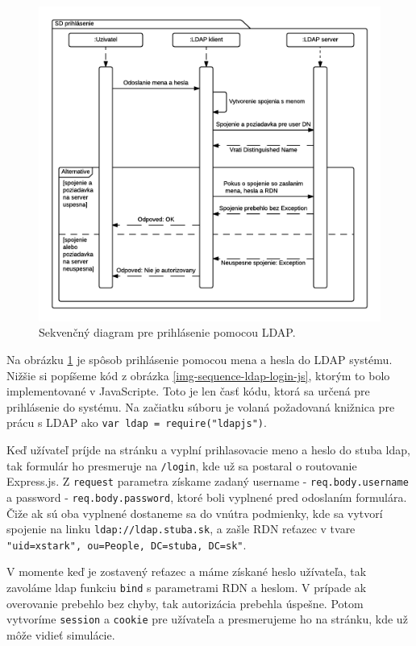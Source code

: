 \begin{figure}[H]
  \centering
  \includegraphics[scale=0.7]{img/diagrams/sequence-ldap.png}
  \caption{Sekvenčný diagram pre prihlásenie pomocou LDAP.}
  \label{img-sequence-ldap-login}
\end{figure}

Na obrázku \ref{img-sequence-ldap-login} je spôsob prihlásenie pomocou mena a hesla do LDAP systému. Nižšie si popíšeme kód z obrázka \ref{img-sequence-ldap-login-js}, ktorým to bolo implementované v JavaScripte. Toto je len časť kódu, ktorá sa určená pre prihlásenie do systému. Na začiatku súboru je volaná požadovaná knižnica pre prácu s LDAP ako \verb|var ldap = require("ldapjs")|.

Keď užívateľ príjde na stránku a vyplní prihlasovacie meno a heslo do stuba ldap, tak formulár ho presmeruje na \verb|/login|, kde už sa postaral o routovanie Express.js. Z \verb|request| parametra získame zadaný username - \verb|req.body.username| a password - \verb|req.body.password|, ktoré boli vyplnené pred odoslaním formulára. Čiže ak sú oba vyplnené dostaneme sa do vnútra podmienky, kde sa vytvorí spojenie na linku \verb|ldap://ldap.stuba.sk|, a zašle RDN reťazec v tvare \verb|"uid=xstark", ou=People, DC=stuba, DC=sk"|.

V momente keď je zostavený reťazec a máme získané heslo užívateľa, tak zavoláme ldap funkciu \verb|bind| s parametrami RDN a heslom. V prípade ak overovanie prebehlo bez chyby, tak autorizácia prebehla úspešne. Potom vytvoríme \verb|session| a \verb|cookie| pre užívateľa a presmerujeme ho na stránku, kde už môže vidieť simulácie.

